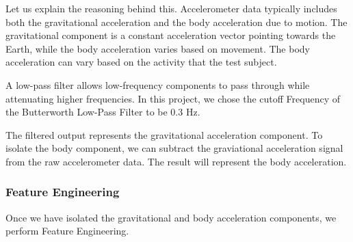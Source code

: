 \documentclass[11pt]{article}
\begin{document}
Let us explain the reasoning behind this. Accelerometer data typically includes both the gravitational acceleration and the body acceleration due to motion. The gravitational component is a constant acceleration vector pointing towards the Earth, while the body acceleration varies based on movement. The body acceleration can vary based on the activity that the test subject. \newline 

A low-pass filter allows low-frequency components to pass through while attenuating higher frequencies. In this project, we chose the cutoff Frequency of the Butterworth Low-Pass Filter to be 0.3 Hz. \newline 

The filtered output represents the gravitational acceleration component. To isolate the body component, we can subtract the graviational acceleration signal from the raw accelerometer data. The result will  represent the body acceleration. \newline 

\subsubsection{Feature Engineering}
Once we have isolated the gravitational and body acceleration components, we perform Feature Engineering. \newline 
\end{document}
